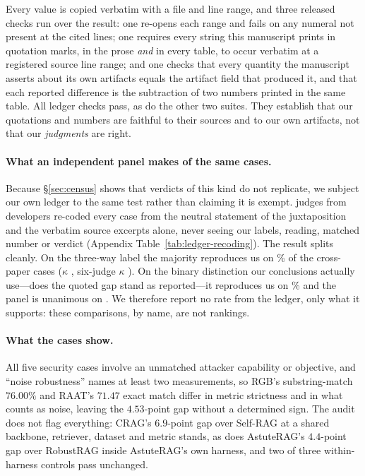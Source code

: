 \documentclass[11pt]{article}
\begin{document}
Every value is copied verbatim with a file and line range, and three released
checks run over the result: one re-opens each range and fails on any numeral not
present at the cited lines; one requires every string this manuscript prints in
quotation marks, in the prose \emph{and} in every table, to occur verbatim at a
registered source line range; and one checks that every quantity the manuscript
asserts about its own artifacts equals the artifact field that produced it, and
that each reported difference is the subtraction of two numbers printed in the
same table. All \VerifChecks{} ledger checks pass, as do the other two suites.
They establish that our quotations and numbers are faithful to their sources and
to our own artifacts, not that our \emph{judgments} are right.

\paragraph{What an independent panel makes of the same cases.}
Because \S\ref{sec:census} shows that verdicts of this kind do not replicate, we
subject our own ledger to the same test rather than claiming it is exempt.
\RecJudges{} judges from \RecDevs{} developers re-coded every case from the
neutral statement of the juxtaposition and the verbatim source excerpts alone,
never seeing our labels, reading, matched number or verdict (Appendix
Table~\ref{tab:ledger-recoding}). The result splits cleanly. On the three-way
label the majority reproduces us on \RecThreeWayPct\% of the \RecCases{}
cross-paper cases ($\kappa$ \RecThreeWayK{}, six-judge $\kappa$ \RecPanelK{}).
On the binary distinction our conclusions actually use---does the quoted gap
stand as reported---it reproduces us on \RecBinaryPct\% and the panel is
unanimous on \RecBinaryUnan{}. We therefore report no rate from the ledger, only
what it supports: these comparisons, by name, are not rankings.

\paragraph{What the cases show.}
All five security cases involve an unmatched attacker capability or objective,
and ``noise robustness'' names at least two measurements, so RGB's
substring-match $76.00\%$ and RAAT's $71.47$ exact match differ in metric
strictness and in what counts as noise, leaving the $4.53$-point gap without a
determined sign. The audit does not flag everything: CRAG's $6.9$-point gap over
Self-RAG at a shared backbone, retriever, dataset and metric stands, as does
AstuteRAG's $4.4$-point gap over RobustRAG inside AstuteRAG's own harness, and
two of three within-harness controls pass unchanged.
\end{document}
